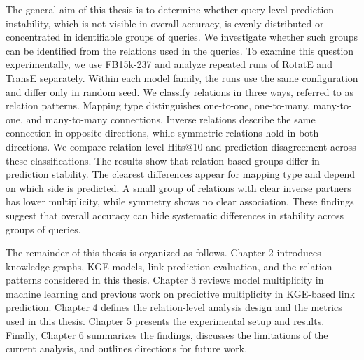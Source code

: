 The general aim of this thesis is to determine whether query-level prediction
instability, which is not visible in overall accuracy, is evenly distributed
or concentrated in identifiable groups of queries. We investigate whether such
groups can be identified from the relations used in the queries. To examine
this question experimentally, we use FB15k-237 and analyze repeated runs of
RotatE and TransE separately. Within each model family, the runs use the same
configuration and differ only in random seed. We classify relations in three
ways, referred to as relation patterns. Mapping type distinguishes one-to-one,
one-to-many, many-to-one, and many-to-many connections. Inverse relations
describe the same connection in opposite directions, while symmetric relations
hold in both directions. We compare relation-level Hits@10 and prediction
disagreement across these classifications. The results show that relation-based
groups differ in prediction stability. The clearest differences appear for
mapping type and depend on which side is predicted. A small group of relations
with clear inverse partners has lower multiplicity, while symmetry shows no
clear association. These findings suggest that overall accuracy can hide
systematic differences in stability across groups of queries.

The remainder of this thesis is organized as follows. Chapter 2 introduces
knowledge graphs, KGE models, link prediction evaluation, and the relation
patterns considered in this thesis. Chapter 3 reviews model multiplicity in
machine learning and previous work on predictive multiplicity in KGE-based
link prediction. Chapter 4 defines the relation-level analysis design and the
metrics used in this thesis. Chapter 5 presents the experimental setup and
results. Finally, Chapter 6 summarizes the findings, discusses the limitations
of the current analysis, and outlines directions for future work.

